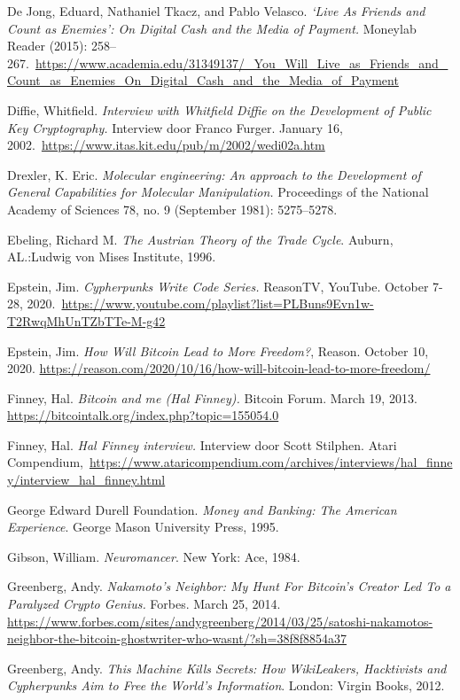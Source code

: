 \documentclass[
  a5paper,
  smalldemyvopaper,11pt,twoside,onecolumn,openright,extrafontsizes,
hidelinks]{memoir}
\begin{document}
De Jong, Eduard, Nathaniel Tkacz, and Pablo Velasco. \emph{`Live As
Friends and Count as Enemies': On Digital Cash and the Media of
Payment.} Moneylab Reader (2015):
258--267.~\url{https://www.academia.edu/31349137/_You_Will_Live_as_Friends_and_Count_as_Enemies_On_Digital_Cash_and_the_Media_of_Payment}

Diffie, Whitfield. \emph{Interview with Whitfield Diffie on the
Development of Public Key Cryptography.} Interview door Franco Furger.
January 16, 2002.~\url{https://www.itas.kit.edu/pub/m/2002/wedi02a.htm}

Drexler, K. Eric. \emph{Molecular engineering: An approach to the
Development of General Capabilities for Molecular Manipulation.}
Proceedings of the National Academy of Sciences 78, no. 9 (September
1981): 5275--5278.

Ebeling, Richard M. \emph{The Austrian Theory of the Trade Cycle}.
Auburn, AL.:Ludwig von Mises Institute, 1996.

Epstein, Jim. \emph{Cypherpunks Write Code Series.} ReasonTV, YouTube.
October 7-28,
2020.~\url{https://www.youtube.com/playlist?list=PLBuns9Evn1w-T2RwqMhUnTZbTTe-M-g42}

Epstein, Jim. \emph{How Will Bitcoin Lead to More Freedom?}, Reason.
October 10, 2020.
\url{https://reason.com/2020/10/16/how-will-bitcoin-lead-to-more-freedom/}

Finney, Hal. \emph{Bitcoin and me (Hal Finney).} Bitcoin Forum. March
19, 2013. \url{https://bitcointalk.org/index.php?topic=155054.0}

Finney, Hal. \emph{Hal Finney interview.} Interview door Scott Stilphen.
Atari
Compendium,~\url{https://www.ataricompendium.com/archives/interviews/hal_finney/interview_hal_finney.html}

George Edward Durell Foundation. \emph{Money and Banking: The American
Experience}. George Mason University Press, 1995.

Gibson, William. \emph{Neuromancer}. New York: Ace, 1984.

Greenberg, Andy. \emph{Nakamoto's Neighbor: My Hunt For Bitcoin's
Creator Led To a Paralyzed Crypto Genius.} Forbes. March 25, 2014.
\url{https://www.forbes.com/sites/andygreenberg/2014/03/25/satoshi-nakamotos-neighbor-the-bitcoin-ghostwriter-who-wasnt/?sh=38f8f8854a37}

Greenberg, Andy. \emph{This Machine Kills Secrets: How WikiLeakers,
Hacktivists and Cypherpunks Aim to Free the World's Information}.
London: Virgin Books, 2012.
\end{document}
